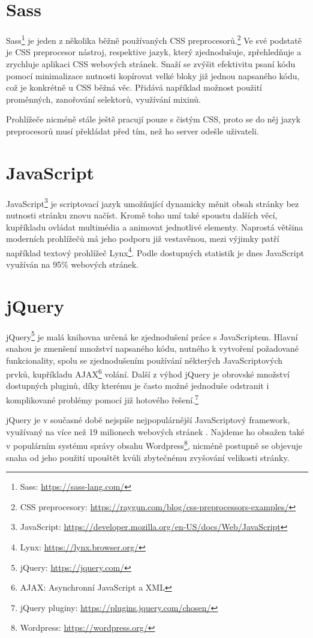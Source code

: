 \section{Sass}
Sass\footnote{Sass: \url{https://sass-lang.com/}} je jeden z několika běžně používaných CSS preprocesorů.\footnote{CSS preprocesory: \url{https://raygun.com/blog/css-preprocessors-examples/}} Ve své podstatě je CSS preprocesor nástroj, respektive jazyk, který zjednodušuje, zpřehledňuje a zrychluje aplikaci CSS webových stránek. Snaží se zvýšit efektivitu psaní kódu pomocí minimalizace nutnosti kopírovat velké bloky již jednou napsaného kódu, což je konkrétně u CSS běžná věc. Přidává například možnost použití proměnných, zanořování selektorů, využívání mixinů. 
\par Prohlížeče nicméně stále ještě pracují pouze s čistým CSS, proto se do něj jazyk preprocesorů musí překládat před tím, než ho server odešle uživateli. 


\section{JavaScript}
JavaScript\footnote{JavaScript: \url{https://developer.mozilla.org/en-US/docs/Web/JavaScript}} je scriptovací jazyk umožňující dynamicky měnit obsah stránky bez nutnosti stránku znovu načíst. Kromě toho umí také spoustu dalších věcí, kupříkladu ovládat multimédia a animovat jednotlivé elementy. Naprostá většina moderních prohlížečů má jeho podporu již vestavěnou, mezi výjimky patří například textový prohlížeč Lynx\footnote{Lynx: \url{https://lynx.browser.org/}}. Podle dostupných statistik \cite{JAVASCRIPT-USAGE} je dnes JavaScript využíván na 95\% webových stránek.

\section{jQuery}
jQuery\footnote{jQuery: \url{https://jquery.com/}} je malá knihovna určená ke zjednodušení práce s JavaScriptem. Hlavní snahou je zmenšení množství napsaného kódu, nutného k vytvoření požadované funkcionality, spolu se zjednodušením používání některých JavaScriptových prvků, kupříkladu AJAX\footnote{AJAX: Asynchronní JavaScript a XML} volání. \cite{JQUERY} Další z výhod jQuery je obrovské množství dostupných pluginů, díky kterému je často možné jednoduše odstranit i komplikované problémy pomocí již hotového řešení.\footnote{jQuery pluginy: \url{https://plugins.jquery.com/chosen/}}  
\par jQuery je v současné době nejspíše nejpopulárnější JavaScriptový framework, využívaný na více než 19 milionech webových stránek \cite{JQUERY-USAGE}. Najdeme ho obsažen také v populárním systému správy obsahu Wordpress\footnote{Wordpress: \url{https://wordpress.org/}}, nicméně postupně se objevuje snaha od jeho použití upouštět kvůli zbytečnému zvyšování velikosti stránky.

